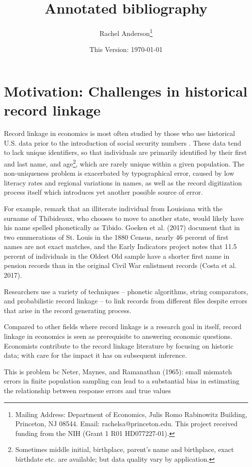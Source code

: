 \documentclass[12pt]{article}
\title{\singlespacing Annotated bibliography}
\author{\singlespacing \vspace{-50pt} Rachel Anderson\thanks{Mailing Address: Department of Economics, Julis Romo Rabinowitz Building, Princeton, NJ 08544. Email: rachelsa@princeton.edu. This project received funding from the NIH (Grant 1 R01 HD077227-01). }}
\date{\vspace{-40pt} This Version: \today}
\begin{document}
\doublespacing
\maketitle

\section{Motivation: Challenges in historical record linkage}
Record linkage in economics is most often studied by those who use historical U.S. data prior to the introduction of social security numbers \citep{abe2019,aizer2016,ferrie96}.  These data tend to lack unique identifiers, so that individuals are primarily identified by their first and last name, and age\footnote{Sometimes middle initial, birthplace, parent's name and birthplace, exact birthdate etc. are available; but data quality vary by application.}, which are rarely unique within a given population.   The non-uniqueness problem is exacerbated by typographical error, caused by low literacy rates and regional variations in names, as well as the record digitization process itself which introduces yet another possible source of error.    

For example, \cite{nq2015} remark that an illiterate individual from Louisiana with the surname of Thibideaux, who chooses to move to another state, would likely have his name spelled phonetically as Tibido.  Goeken et al. (2017) document that in two enumerations of St. Louis in the 1880 Census, nearly 46 percent of first names are not exact matches, and the Early Indicators project notes that 11.5 percent of individuals in the Oldest Old sample have a shorter first name in pension records than in the original Civil War enlistment records (Costa et al. 2017). 

Researchers use a variety of techniques -- phonetic algorithms, string comparators, and probabilistic record linkage -- to link records from different files despite errors that arise in the record generating process.  

Compared to other fields where record linkage is a research goal in itself, record linkage in economics is seen as prerequisite to answering economic questions.  Economists contribute to the record linkage literature by focusing on historic data; with care for the impact it has on subsequent inference.   

This is problem bc  Neter, Maynes, and Ramanathan (1965): small mismatch errors in finite population sampling can lead to a substantial bias in estimating the relationship between response errors and true values
\end{document}
